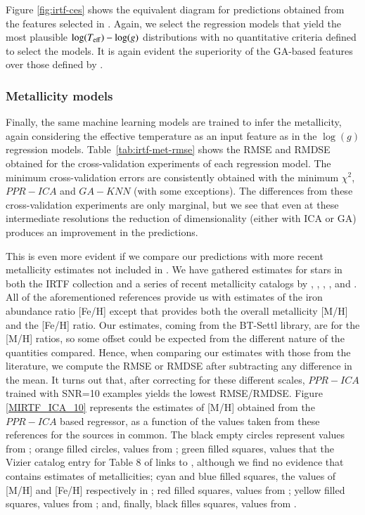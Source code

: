 Figure \ref{fig:irtf-ces} shows the equivalent diagram for predictions
obtained from the features selected in \cite{cesetti}. Again, we
select the regression models that yield the most plausible
$\log(T_{\rm eff})-\log(g)$ distributions with no quantitative
criteria defined to select the models. It is again evident the
superiority of the GA-based features over those defined
by \cite{cesetti}.

\subsubsection{Metallicity models} 
\label{sect:irtf-met}

Finally, the same machine learning models are trained to infer the
metallicity, again considering the effective temperature as an input
feature as in the $\log(g)$ regression
models. Table~\ref{tab:irtf-met-rmse} shows the RMSE and RMDSE
obtained for the cross-validation experiments of each regression
model. The minimum cross-validation errors are consistently obtained
with the minimum $\chi^2$, $PPR-ICA$ and $GA-KNN$ (with some
exceptions). The differences from these cross-validation experiments
are only marginal, but we see that even at these intermediate
resolutions the reduction of dimensionality (either with ICA or GA)
produces an improvement in the predictions. 

This is even more evident if we compare our predictions with more
recent metallicity estimates not included in \cite{cesetti}. We have
gathered estimates for stars in both the IRTF collection and a series
of recent metallicity catalogs
by \cite{RA2012}, \cite{NevesIII}, \cite{Newton2014}, \cite{Gaidos2015},
and \cite{Mann2015}. All of the aforementioned references provide us
with estimates of the iron abundance ratio [Fe/H] except \cite{RA2012}
that provides both the overall metallicity [M/H] and the [Fe/H]
ratio. Our estimates, coming from the BT-Settl library, are for the
[M/H] ratios, so some offset could be expected from the different
nature of the quantities compared. Hence, when comparing our estimates
with those from the literature, we compute the RMSE or RMDSE after
subtracting any difference in the mean. It turns out that, after
correcting for these different scales, $PPR-ICA$ trained with SNR=10
examples yields the lowest RMSE/RMDSE. Figure \ref{MIRTF_ICA_10}
represents the estimates of [M/H] obtained from the $PPR-ICA$ based
regressor, as a function of the values taken from these references for
the sources in common. The black empty circles represent values
from \cite{cesetti} ; orange filled circles, values
from \cite{NevesIII}; green filled squares, values that the Vizier
catalog entry for Table 8 of
\cite{NevesIII} links to \cite{Jao}, although we find no evidence
that \cite{Jao} contains estimates of metallicities; cyan and blue
filled squares, the values of [M/H] and [Fe/H] respectively
in \cite{RA2012}; red filled squares, values from \cite{Mann2015};
yellow filled squares, values from \cite{Newton2014}; and, finally,
black filles squares, values from \cite{Gaidos2015}.

